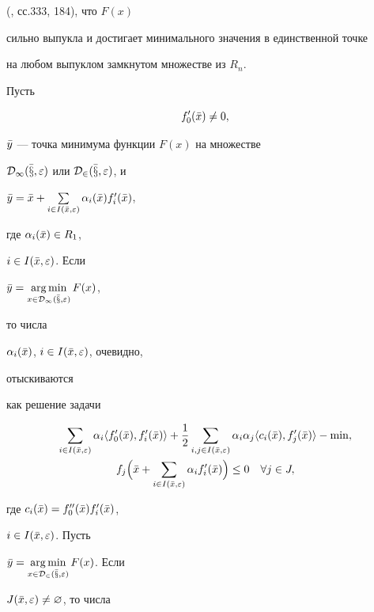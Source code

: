 (\cite{Vas}, сс.333, 184), что $F(x)$


сильно выпукла и достигает минимального значения в единственной точке


на любом выпуклом замкнутом множестве из $R_n$.





Пусть


\begin{equation}


f'_0(\Bar x)\ne 0,


\end{equation}


$\Bar y$ --- точка минимума функции $F(x)$ на множестве


$\cal D_1(\Bar x,\varepsilon)$ или $\cal D_2(\Bar x,\varepsilon)$, и


$\Bar y=\Bar x+\sum\limits_{i\in I(\Bar x,\varepsilon)}\alpha_i


(\Bar x)f'_i(\Bar x)$,


где $\alpha_i(\Bar x)\in R_1$,


$i\in I(\Bar x,\varepsilon)$. Если


$\Bar y=\argmin\limits_{x\in\cal D_1(\Bar x,\varepsilon)}F(x)$,


то числа


$\alpha_i(\Bar x)$, $i\in I(\Bar x,\varepsilon)$, очевидно,


отыскиваются


как решение задачи


\begin{gather}


\sum_{i\in I(\Bar x,\varepsilon)}\alpha_i\la f'_0(\Bar x),


f'_i(\Bar x)\ra+\frac{1}{2}\sum_{i,j\in I(\Bar x,\varepsilon)}


\alpha_i\alpha_j\la c_i(\Bar x),f'_j(\Bar x)\ra-\min,\\


f_j\Bigl(\Bar x+\sum_{i\in I(\Bar x,\varepsilon)}\alpha_i


f'_i(\Bar x)\Bigr)\le 0\quad \forall j\in J,


\end{gather}


где $c_i(\Bar x)=f''_0(\Bar x)f'_i(\Bar x)$,


$i\in I(\Bar x,\varepsilon)$. Пусть


$\Bar y=\argmin\limits_{x\in\cal D_2(\Bar x,\varepsilon)}F(x)$. Если


$J(\Bar x,\varepsilon)\ne\varnothing$, то числа



